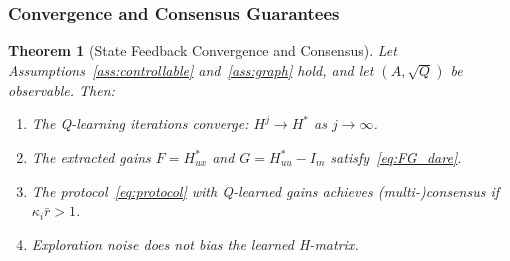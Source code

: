 \documentclass[12pt]{elsarticle}
\newtheorem{theorem}{Theorem}
\theoremstyle{remark}
\begin{document}
\subsubsection{Convergence and Consensus Guarantees}
\label{subsec:sf_convergence}
\begin{theorem}[State Feedback Convergence and Consensus]
\label{thm:sf_convergence}
Let Assumptions~\ref{ass:controllable} and~\ref{ass:graph} hold, and let $(A, \sqrt{Q})$ be observable. Then:
\begin{enumerate}
    \item[(i)] The Q-learning iterations converge: $H^j \to H^*$ as $j \to \infty$.
    \item[(ii)] The extracted gains $F = H_{ux}^*$ and $G = H_{uu}^* - I_m$ satisfy~\eqref{eq:FG_dare}.
    \item[(iii)] The protocol~\eqref{eq:protocol} with Q-learned gains achieves (multi-)consensus if $\kappa_i \bar{r} > 1$.
    \item[(iv)] Exploration noise does not bias the learned H-matrix.
\end{enumerate}
\end{theorem}
\end{document}
